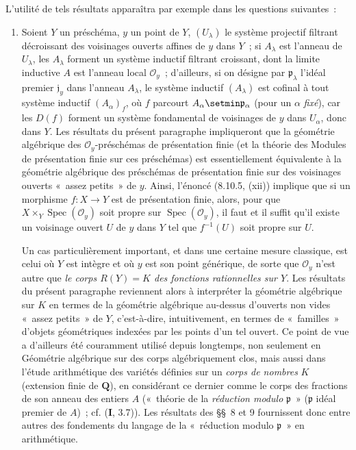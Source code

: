 \begin{env}[8.1.2]
L'utilité de tels résultats apparaîtra par exemple dans les questions
suivantes~:
\begin{enumerate}
\item[\emph{a)}] Soient $Y$ un préschéma, $y$ un point de $Y$, $(U_\lambda)$
le système projectif filtrant décroissant des voisinages ouverts affines de
$y$ dans $Y$~; si $A_\lambda$ est l'anneau de $U_\lambda$, les $A_\lambda$
forment un système inductif filtrant croissant, dont la limite inductive $A$
est l'anneau local $\mathcal O_y$~; d'ailleurs, si on désigne par
$\mathfrak p_\lambda$ l'idéal premier $\mathfrak j_y$ dans l'anneau
$A_\lambda$, le système inductif $(A_\lambda)$ est cofinal à tout système
inductif $(A_\alpha)_f$, où $f$ parcourt
$A_\alpha\setmin\mathfrak p_\alpha$ (pour un $\alpha$ \emph{fixé}), car les $D(f)$
forment un système fondamental de voisinages de $y$ dans $U_\alpha$,
donc dans $Y$. Les résultats du présent paragraphe impliqueront que la
géométrie algébrique des $\mathcal O_y$-préschémas de présentation finie (et
la théorie des Modules de présentation finie sur ces préschémas) est
essentiellement équivalente à la géométrie algébrique des préschémas de
présentation finie sur des voisinages ouverts «~assez petits~» de $y$. Ainsi,
l'énoncé (8.10.5, (xii)) implique que si un morphisme $f:X\to Y$ est de
présentation finie, alors, pour que
$X\times_Y\operatorname{Spec}(\mathcal O_y)$ soit propre sur
$\operatorname{Spec}(\mathcal O_y)$, il faut et il suffit qu'il existe un
voisinage ouvert $U$ de $y$ dans $Y$ tel que $f^{-1}(U)$ soit propre sur $U$.

Un cas particulièrement important, et dans une certaine mesure classique,
est celui où $Y$ est intègre et où $y$ est son point générique, de sorte que
$\mathcal O_y$ n'est autre que \emph{le corps $R(Y)=K$ des fonctions
rationnelles sur $Y$}. Les résultats du présent paragraphe reviennent alors à
interpréter la géométrie algébrique sur $K$ en termes de la géométrie
algébrique au-dessus d'ouverts non vides «~assez petits~» de $Y$, c'est-à-dire,
intuitivement, en termes de «~familles~» d'objets géométriques indexées par les
points d'un tel ouvert. Ce point de vue a d'ailleurs été couramment utilisé
depuis longtemps, non seulement en Géométrie algébrique sur des corps
algébriquement clos, mais aussi dans l'étude arithmétique des variétés définies
sur un \emph{corps de nombres} $K$ (extension finie de $\mathbf Q$), en
considérant ce dernier comme le corps des fractions de son anneau des entiers
$A$ («~théorie de la \emph{réduction modulo} $\mathfrak p$~» ($\mathfrak p$
idéal premier de $A$)~; cf. (\textbf{I}, 3.7)). Les résultats des \S\S~8 et 9
fournissent donc entre autres des fondements du langage de la «~réduction
modulo $\mathfrak p$~» en arithmétique.


\end{enumerate}
\end{env}
